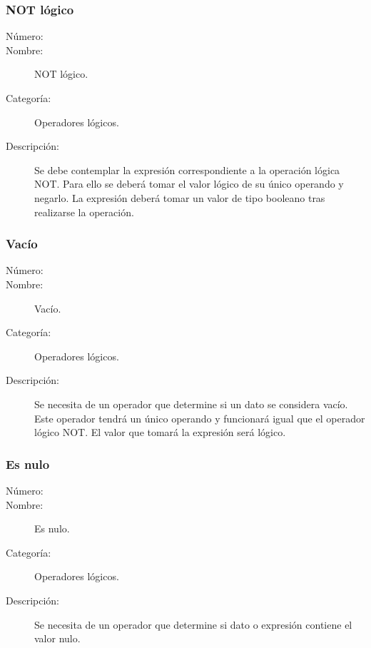 \subsubsection{NOT lógico}
\begin{framed}
	\begin{description}
		\item [Número:] \cn
		\item [Nombre:] NOT lógico.
		\item [Categoría:] Operadores lógicos.
		\item [Descripción:] Se debe contemplar la expresión correspondiente a la operación lógica NOT. Para ello se deberá tomar
		el valor lógico de su único operando y negarlo. La expresión deberá tomar un valor de tipo booleano tras realizarse la operación.
	\end {description}
\end{framed}

\subsubsection{Vacío}
\begin{framed}
	\begin{description}
		\item [Número:] \cn
		\item [Nombre:] Vacío.
		\item [Categoría:] Operadores lógicos.
		\item [Descripción:] Se necesita de un operador que determine si un dato se considera vacío. Este operador tendrá un
		único operando y funcionará igual que el operador lógico NOT. El valor que tomará la expresión será lógico.
	\end {description}
\end{framed}

\subsubsection{Es nulo}
\begin{framed}
	\begin{description}
		\item [Número:] \cn
		\item [Nombre:] Es nulo.
		\item [Categoría:] Operadores lógicos.
		\item [Descripción:] Se necesita de un operador que determine si dato o expresión contiene el valor nulo.
	\end {description}
\end{framed}


